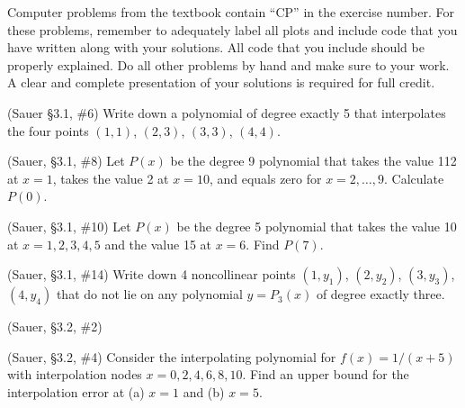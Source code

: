 \documentclass[12pt,fleqn]{exam}
\begin{document}
Computer problems from the textbook contain ``CP'' in the exercise number. For these problems, remember to adequately label all plots and include code that you have written along with your solutions. All code that you include should be properly explained. Do all other problems by hand and make sure to your work. A clear and complete presentation of your solutions is required for full credit.

\begin{questions}

\question (Sauer \S3.1, \#6) Write down a polynomial of degree exactly 5 that interpolates the four points $(1,1)$, $(2,3)$, $(3,3)$, $(4,4)$.

\question (Sauer, \S3.1, \#8) Let $P(x)$ be the degree 9 polynomial that takes the value 112 at $x = 1$, takes the value 2 at $x = 10$, and equals zero for $x = 2,\dots,9$. Calculate $P(0)$.

\question (Sauer, \S3.1, \#10) Let $P(x)$ be the degree 5 polynomial that takes the value 10 at $x = 1,2,3,4,5$ and the value 15 at $x = 6$. Find $P(7)$.

\question (Sauer, \S3.1, \#14) Write down 4 noncollinear points $(1, y_1)$, $(2, y_2)$, $(3, y_3)$, $(4, y_4)$ that do not lie on any polynomial $y = P_3(x)$ of degree exactly three.

\question (Sauer, \S3.2, \#2)


\question (Sauer, \S3.2, \#4) Consider the interpolating polynomial for $f(x) = 1/(x + 5)$ with interpolation nodes $x = 0,2,4,6,8,10$. Find an upper bound for the interpolation error at (a) $x = 1$ and (b) $x = 5$.


\end{questions}
\end{document}
